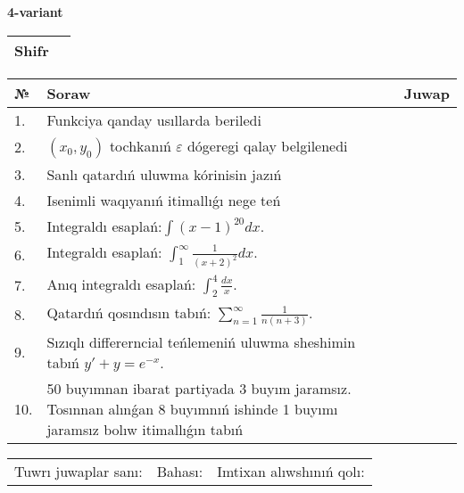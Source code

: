\documentclass{article}
\begin{document}
  \egroup
  
  \newpage
  
  
  \textbf{4-variant}\\
  
  \bgroup
  \def\arraystretch{1.6} %
  
  \begin{tabular}{|m{5.7cm}|m{9.5cm}|}
  \hline
  Shifr & \\
  \hline
  \end{tabular}
  
  \vspace{1cm}
  
  \begin{tabular}{|m{0.7cm}|m{10cm}|m{4cm}|}
  \hline
  № & Soraw & Juwap \\
  \hline
  1. & Funkciya qanday usıllarda beriledi &  \\
  \hline
  2. & \((x_0,y_0)\) tochkanıń \(\varepsilon\) dógeregi qalay belgilenedi &  \\
  \hline
  3. & Sanlı qatardıń uluwma kórinisin jazıń &  \\
  \hline
  4. & Isenimli waqıyanıń itimallıǵı nege teń &  \\
  \hline
  5. & Integraldı esaplań:\(\int{(x - 1)^{20}}dx\). &  \\
  \hline
  6. & Integraldı esaplań: \(\int_{1}^{\infty}{\frac{1}{(x + 2)^2 }dx}\). &  \\
  \hline
  7. & Anıq integraldı esaplań: \(\int_{2}^{4}\frac{dx}{x}\). &  \\
  \hline
  8. & Qatardıń qosındısın tabıń: \(\sum_{n = 1}^{\infty}\frac{1}{n(n + 3)}\). &  \\
  \hline
  9. & Sızıqlı differerncial teńlemeniń uluwma sheshimin tabıń \(y' + y = e^{- x}\). &  \\
  \hline
  10. & 50 buyımnan ibarat partiyada 3 buyım jaramsız. Tosınnan alınǵan 8 buyımnıń ishinde 1 buyımı jaramsız bolıw itimallıǵın tabıń &  \\
  \hline
  \end{tabular}
  
  \vspace{1cm}
  
  \begin{tabular}{lll}
  Tuwrı juwaplar sanı: \underline{\hspace{1.5cm}} & 
  Bahası: \underline{\hspace{1.5cm}} & 
  Imtixan alıwshınıń qolı: \underline{\hspace{2cm}} \\
  \end{tabular}
  
\end{document}
